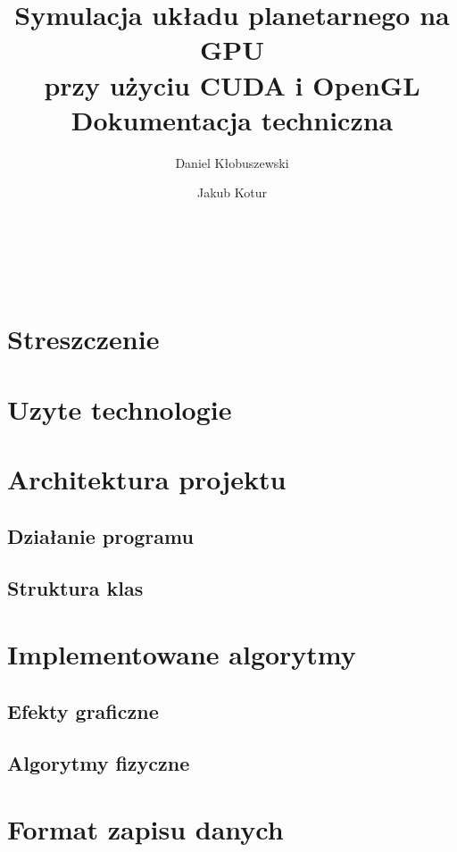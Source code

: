 \documentclass[a4paper,titlepage,10pt]{article}
\title{\huge Symulacja układu planetarnego na GPU\\ przy użyciu CUDA i OpenGL\\\small Dokumentacja techniczna}
\author{Daniel Kłobuszewski\and Jakub Kotur}
\begin{document}
	\maketitle
	
	\pagestyle{fancyplain}
	\cfoot{\thepage/\pageref{LastPage}}

	\hfill \\
	
	\hfill \\
	

	\newpage

	\tableofcontents
	\newpage

	\section{Streszczenie}\label{sec:streszczenie}
	
	\section{Uzyte technologie}\label{sec:uzyte technologie}
	
	\section{Architektura projektu}\label{sec:architektura projektu}
	\subsection{Działanie programu}\label{sub:dzialanie programu}
	
	\subsection{Struktura klas}\label{sub:struktura klas}
	
	\section{Implementowane algorytmy}\label{sec:implementowane algorytmy}
	\subsection{Efekty graficzne}\label{sub:algorytmy graficzne}
	
	\subsection{Algorytmy fizyczne}\label{sub:algorytmy fizyczne}
	
	\section{Format zapisu danych}\label{sec:format zapisu danych}
	
\end{document}
